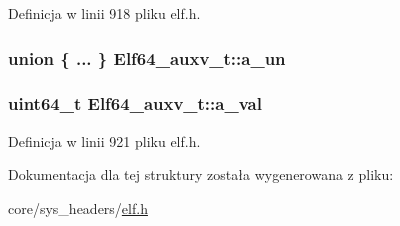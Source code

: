 Definicja w linii 918 pliku elf.\-h.

\hypertarget{struct_elf64__auxv__t_a988fa43fd867a7c0b571fa9f505ecc1c}{
\subsubsection[{a\-\_\-un}]{\setlength{\rightskip}{0pt plus 5cm}union \{ ... \}   Elf64\-\_\-auxv\-\_\-t\-::a\-\_\-un}}\label{struct_elf64__auxv__t_a988fa43fd867a7c0b571fa9f505ecc1c}
\hypertarget{struct_elf64__auxv__t_ae9741865b74b4fbe872d5de874feb207}{
\subsubsection[{a\-\_\-val}]{\setlength{\rightskip}{0pt plus 5cm}uint64\-\_\-t Elf64\-\_\-auxv\-\_\-t\-::a\-\_\-val}}\label{struct_elf64__auxv__t_ae9741865b74b4fbe872d5de874feb207}


Definicja w linii 921 pliku elf.\-h.



Dokumentacja dla tej struktury została wygenerowana z pliku\-:\begin{DoxyCompactItemize}
\item 
core/sys\-\_\-headers/\hyperlink{elf_8h}{elf.\-h}\end{DoxyCompactItemize}
